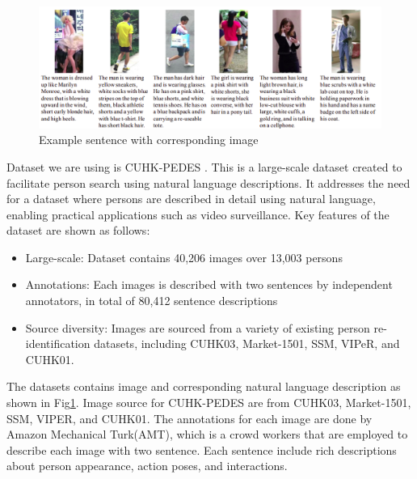 \begin{figure}[htbp]
  \begin{center}
      \includegraphics[width=\linewidth]{img/cuhk_pedes.png}
      \caption{Example sentence with corresponding image}
      \label{fig:cuhk_pedes}
  \end{center}
\end{figure}


Dataset we are using is CUHK-PEDES \cite{li2017personsearchnaturallanguage}. This is a large-scale dataset created to facilitate person search using natural language descriptions. It addresses the need for a dataset where persons are described in detail using natural language, enabling practical applications such as video surveillance. Key features of the dataset are shown as follows:
\begin{itemize}
  \item Large-scale: Dataset contains 40,206 images over 13,003 persons 
  \item Annotations: Each images is described with two sentences by independent annotators, in total of 80,412 sentence descriptions
  \item Source diversity: Images are sourced from a variety of existing person re-identification datasets, including CUHK03\cite{li2014deepreid}, Market-1501\cite{7410490}, SSM\cite{ssm}, VIPeR\cite{viper}, and CUHK01\cite{li2012human}.
\end{itemize}

The datasets contains image and corresponding natural language description as shown in Fig\ref{fig:cuhk_pedes}. Image source for CUHK-PEDES are from CUHK03, Market-1501, SSM, VIPER, and CUHK01. The annotations for each image are done by Amazon Mechanical Turk(AMT), which is a crowd workers that are employed to describe each image with two sentence. Each sentence include rich descriptions about person appearance, action poses, and interactions.


